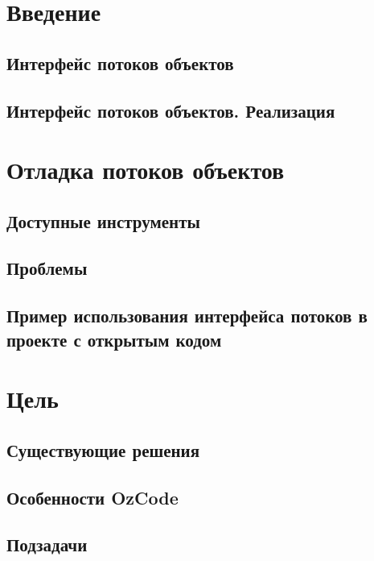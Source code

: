

\section{Введение}

\subsection{Интерфейс потоков объектов}

\subsection{Интерфейс потоков объектов. Реализация}



\section{Отладка потоков объектов}
\subsection{Доступные инструменты}

\subsection{Проблемы}

\subsection{Пример использования интерфейса потоков в проекте с открытым кодом}


\section{Цель}

\subsection{Существующие решения}

\subsection{Особенности OzCode}

\subsection{Подзадачи}

